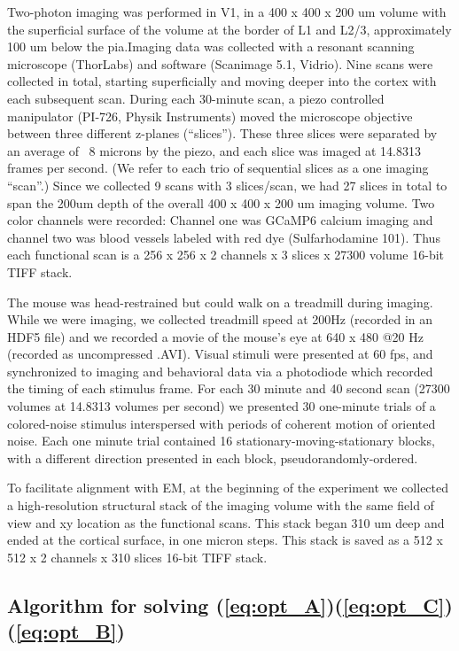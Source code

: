 \documentclass[10pt,letterpaper]{article}
\begin{document}
{Two-photon imaging was performed in V1, in a 400 x 400 x 200 um volume with the superficial surface of the volume at the border of L1 and L2/3, approximately 100 um below the pia.Imaging data was collected with a resonant scanning microscope (ThorLabs) and software (Scanimage 5.1, Vidrio). Nine scans were collected in total, starting superficially and moving deeper into the cortex with each subsequent scan. During each 30-minute scan, a piezo controlled manipulator (PI-726, Physik Instruments) moved the microscope objective between three different z-planes (“slices”). These three slices were separated by an average of ~8 microns by the piezo, and each slice was imaged at 14.8313 frames per second. (We refer to each trio of sequential slices as a one imaging ``scan”.) Since we collected 9 scans with 3 slices/scan, we had 27 slices in total to span the 200um depth of the overall 400 x 400 x 200 um imaging volume. Two color channels were recorded: Channel one was GCaMP6 calcium imaging and channel two was blood vessels labeled with red dye (Sulfarhodamine 101). Thus each functional scan is a 256 x 256 x 2 channels x 3 slices x 27300 volume 16-bit TIFF stack. 

The mouse was head-restrained but could walk on a treadmill during imaging. While we were imaging, we collected treadmill speed at 200Hz (recorded in an HDF5 file) and we recorded a movie of the mouse’s eye at 640 x 480 @20 Hz (recorded as uncompressed .AVI). Visual stimuli were presented at 60 fps, and synchronized to imaging and behavioral data via a photodiode which recorded the timing of each stimulus frame. For each 30 minute and 40 second scan (27300 volumes at 14.8313 volumes per second) we presented 30 one-minute trials of a colored-noise stimulus \citep{niell_highly_2008} interspersed with periods of coherent motion of oriented noise. Each one minute trial contained 16 stationary-moving-stationary blocks, with a different direction presented in each block, pseudorandomly-ordered. 

To facilitate alignment with EM, at the beginning of the experiment we collected a high-resolution structural stack of the imaging volume with the same field of view and xy location as the functional scans. This stack began 310 um deep and ended at the cortical surface, in one micron steps. This stack is saved as a 512 x 512 x 2 channels x 310 slices 16-bit TIFF stack. 


\subsection{Algorithm for solving (\ref{eq:opt_A})(\ref{eq:opt_C})(\ref{eq:opt_B})} \label{sec:update_abc}

}
\end{document}

